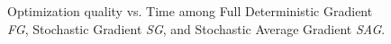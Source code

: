 \begin{figure}
\centerline{}
\caption[Optimization Quality among gradient methods]{Optimization quality vs. Time among Full Deterministic Gradient \emph{FG}, Stochastic Gradient \emph{SG}, and Stochastic Average Gradient \emph{SAG}.}
\label{table:approx}
\end{figure}



